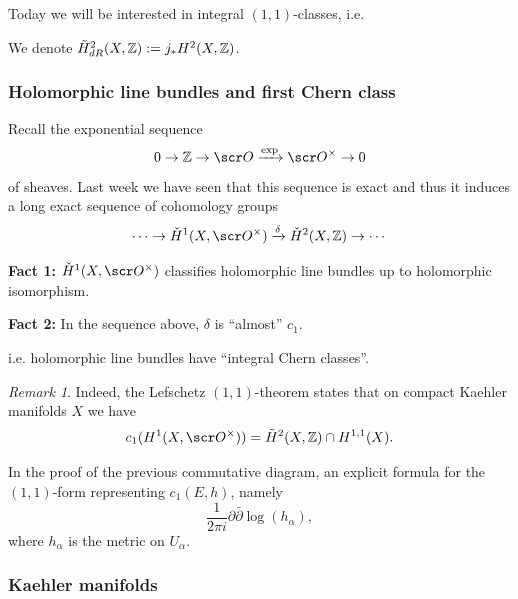 \documentclass[A4paper, british]{amsart}
\theoremstyle{darkgreentheorem}
\theoremstyle{darkbluedefinition}
\theoremstyle{darkredexample}
\theoremstyle{remark}
\newtheorem{rem}[thm]{Remark}
\newcommand{\1}{\mathbbm{1}}
\begin{document}
Today we will be interested in integral $(1,1)$-classes, i.e.
\begin{center}
\end{center}
We denote $\tilde{H}_{dR}^{2}(X,\mathbb{Z}):= j_{*}H^{2}(X,\mathbb{Z})$.

\subsubsection{Holomorphic line bundles and first Chern class}

Recall the exponential sequence
\[ 0\to \Z\to \O\xrightarrow{\exp}\O^{\times}\to 0\]
of sheaves.
Last week we have seen that this sequence is exact and thus it induces a long exact sequence of cohomology groups
\[ \cdots \to \check{H}^{1}(X,\O^{\times})\xrightarrow{\delta} \check{H}^{2}(X,\Z)\to \cdots \]

\textbf{Fact 1:} $\check{H}^{1}(X,\O^{\times})$ classifies holomorphic line bundles up to holomorphic isomorphism.

\textbf{Fact 2:} In the sequence above, $\delta$ is ``almost'' $c_{1}$.
\begin{center}
\end{center}
i.e. holomorphic line bundles have ``integral Chern classes''.

\begin{rem}
    Indeed, the Lefschetz $(1,1)$-theorem states that on compact Kaehler manifolds $X$ we have
    \[ c_{1}(H^{1}(X,\O^{\times}))=\tilde{H}^{2}(X,\Z)\cap H^{1,1}(X). \]
\end{rem}

In the proof of the previous commutative diagram, an explicit formula for the $(1,1)$-form representing $c_{1}(E,h)$, namely
\[ \frac{1}{2\pi i}\partial \bar{\partial} \log(h_{\alpha}),\]
where $h_{\alpha}$ is the metric on $U_{\alpha}$.

\subsubsection{Kaehler manifolds}
\end{document}
